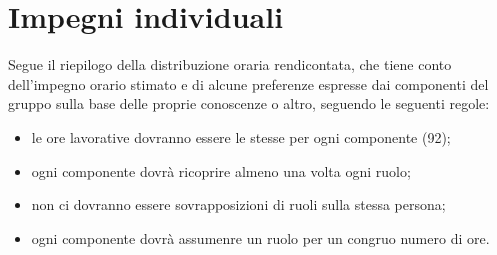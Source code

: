 


\section{Impegni individuali}
 Segue il riepilogo della distribuzione oraria rendicontata, che tiene conto dell'impegno orario stimato e di alcune preferenze espresse dai componenti del gruppo sulla base delle proprie conoscenze o altro, seguendo le seguenti regole:
    \begin{itemize}
        \item le ore lavorative dovranno essere le stesse per ogni componente (92);
        \item ogni componente dovrà ricoprire almeno una volta ogni ruolo;
        \item non ci dovranno essere sovrapposizioni di ruoli sulla stessa persona;
        \item ogni componente dovrà assumenre un ruolo per un congruo numero di ore.
        
    \end{itemize}

